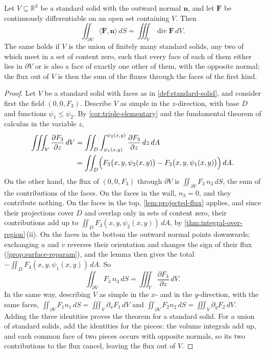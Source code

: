 \begin{theorem}
\label{thm:divergence}
Let $V\subseteq\mathbb R^3$ be a standard solid with the outward normal $\mathbf n$, and let $\mathbf F$ be continuously differentiable on an open set containing $V$. Then
\[
\iint_{\partial V}\langle\mathbf F,\mathbf n\rangle\,dS=\iiint_V\operatorname{div}\mathbf F\,dV .
\]
The same holds if $V$ is the union of finitely many standard solids, any two of which meet in a set of content zero, such that every face of each of them either lies in $\partial V$ or is also a face of exactly one other of them, with the opposite normal; the flux out of $V$ is then the sum of the fluxes through the faces of the first kind.
\end{theorem}

\begin{proof}
Let $V$ be a standard solid with faces as in \cref{def:standard-solid}, and consider first the field $(0,0,F_3)$. Describe $V$ as simple in the $z$-direction, with base $D$ and functions $\psi_1\le\psi_2$. By \cref{cor:triple-elementary} and the fundamental theorem of calculus in the variable $z$,
\[
\begin{aligned}
\iiint_V\frac{\partial F_3}{\partial z}\,dV&=\iint_D\int_{\psi_1(x,y)}^{\psi_2(x,y)}\frac{\partial F_3}{\partial z}\,dz\,dA\\
&=\iint_D\Bigl(F_3\bigl(x,y,\psi_2(x,y)\bigr)-F_3\bigl(x,y,\psi_1(x,y)\bigr)\Bigr)\,dA .
\end{aligned}
\]
On the other hand, the flux of $(0,0,F_3)$ through $\partial V$ is $\iint_{\partial V}F_3\,n_3\,dS$, the sum of the contributions of the faces. On the faces in the wall, $n_3=0$, and they contribute nothing. On the faces in the top, \cref{lem:projected-flux} applies, and since their projections cover $D$ and overlap only in sets of content zero, their contributions add up to $\iint_DF_3(x,y,\psi_2(x,y))\,dA$, by \cref{thm:integral-over-region}\,(ii). On the faces in the bottom the outward normal points downwards; exchanging $u$ and $v$ reverses their orientation and changes the sign of their flux (\cref{prop:surface-reparam}), and the lemma then gives the total $-\iint_DF_3(x,y,\psi_1(x,y))\,dA$. So
\[
\iint_{\partial V}F_3\,n_3\,dS=\iiint_V\frac{\partial F_3}{\partial z}\,dV .
\]
In the same way, describing $V$ as simple in the $x$- and in the $y$-direction, with the same faces, $\iint_{\partial V}F_1n_1\,dS=\iiint_V\partial_xF_1\,dV$ and $\iint_{\partial V}F_2n_2\,dS=\iiint_V\partial_yF_2\,dV$. Adding the three identities proves the theorem for a standard solid. For a union of standard solids, add the identities for the pieces: the volume integrals add up, and each common face of two pieces occurs with opposite normals, so its two contributions to the flux cancel, leaving the flux out of $V$.
\end{proof}

